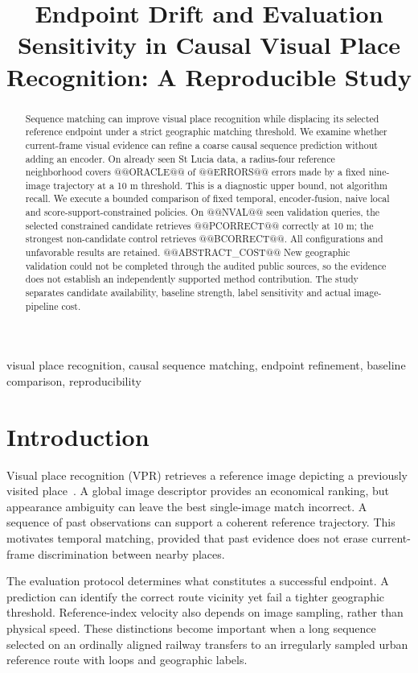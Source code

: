 \documentclass[conference]{IEEEtran}
\title{Endpoint Drift and Evaluation Sensitivity in Causal Visual Place Recognition: A Reproducible Study}
\author{\IEEEauthorblockN{Mingyang Zhou}\IEEEauthorblockA{University of Chinese Academy of Sciences\\\textit{Additional authors and correspondence pending}}}
\begin{document}
\maketitle
\begin{abstract}
Sequence matching can improve visual place recognition while displacing its selected reference endpoint under a strict geographic matching threshold. We examine whether current-frame visual evidence can refine a coarse causal sequence prediction without adding an encoder. On already seen St Lucia data, a radius-four reference neighborhood covers @@ORACLE@@ of @@ERRORS@@ errors made by a fixed nine-image trajectory at a 10 m threshold. This is a diagnostic upper bound, not algorithm recall. We execute a bounded comparison of fixed temporal, encoder-fusion, naive local and score-support-constrained policies. On @@NVAL@@ seen validation queries, the selected constrained candidate retrieves @@PCORRECT@@ correctly at 10 m; the strongest non-candidate control retrieves @@BCORRECT@@. All configurations and unfavorable results are retained. @@ABSTRACT_COST@@ New geographic validation could not be completed through the audited public sources, so the evidence does not establish an independently supported method contribution. The study separates candidate availability, baseline strength, label sensitivity and actual image-pipeline cost.
\end{abstract}
\begin{IEEEkeywords}visual place recognition, causal sequence matching, endpoint refinement, baseline comparison, reproducibility\end{IEEEkeywords}

\section{Introduction}
Visual place recognition (VPR) retrieves a reference image depicting a previously visited place~\cite{tutorial}. A global image descriptor provides an economical ranking, but appearance ambiguity can leave the best single-image match incorrect. A sequence of past observations can support a coherent reference trajectory. This motivates temporal matching, provided that past evidence does not erase current-frame discrimination between nearby places.

The evaluation protocol determines what constitutes a successful endpoint. A prediction can identify the correct route vicinity yet fail a tighter geographic threshold. Reference-index velocity also depends on image sampling, rather than physical speed. These distinctions become important when a long sequence selected on an ordinally aligned railway transfers to an irregularly sampled urban reference route with loops and geographic labels.
\end{document}
